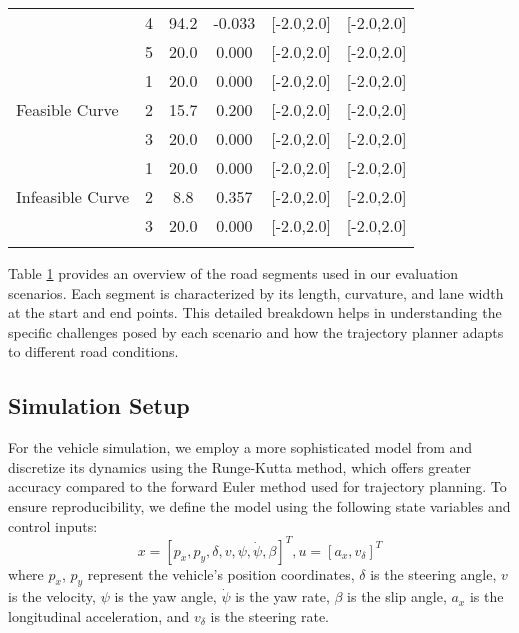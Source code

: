 \begin{longtable}{l c c c c c}
	                                  & 4                & 94.2            & -0.033             & [-2.0,2.0]                              & [-2.0,2.0]   \\
	                                  & 5                & 20.0            & 0.000              & [-2.0,2.0]                              & [-2.0,2.0]   \\
	\midrule
	\multirow{3}{*}{Feasible Curve}   & 1                & 20.0            & 0.000              & [-2.0,2.0]                              & [-2.0,2.0]   \\
	                                  & 2                & 15.7            & 0.200              & [-2.0,2.0]                              & [-2.0,2.0]   \\
	                                  & 3                & 20.0            & 0.000              & [-2.0,2.0]                              & [-2.0,2.0]   \\
	\midrule
	\multirow{3}{*}{Infeasible Curve} & 1                & 20.0            & 0.000              & [-2.0,2.0]                              & [-2.0,2.0]   \\
	                                  & 2                & 8.8             & 0.357              & [-2.0,2.0]                              & [-2.0,2.0]   \\
	                                  & 3                & 20.0            & 0.000              & [-2.0,2.0]                              & [-2.0,2.0]   \\
	\midrule
	\label{tab:road_segments}
\end{longtable}

Table \ref{tab:road_segments} provides an overview of the road segments used in our evaluation scenarios.
Each segment is characterized by its length, curvature, and lane width at the start and end points.
This detailed breakdown helps in understanding the specific challenges posed by each scenario and how the trajectory planner adapts to different road
conditions.

\subsection{Simulation Setup} \label{subsec:simulation}

For the vehicle simulation, we employ a more sophisticated model from \cite{noauthor_dateien_2021} and discretize its dynamics using the Runge-Kutta
method, which offers greater accuracy compared to the forward Euler method used for trajectory planning.
To ensure reproducibility, we define the model using the following state variables and control inputs: \[ x = [p_x, p_y, \delta, v, \psi, \dot{\psi},
	\beta]^T, u = [a_x, v_{\delta}]^T \] where $p_x$, $p_y$ represent the vehicle's position coordinates, $\delta$ is the steering angle, $v$ is the
velocity, $\psi$ is the yaw angle, $\dot{\psi}$ is the yaw rate, $\beta$ is the slip angle, $a_x$ is the longitudinal acceleration, and $v_\delta$ is
the steering rate.

